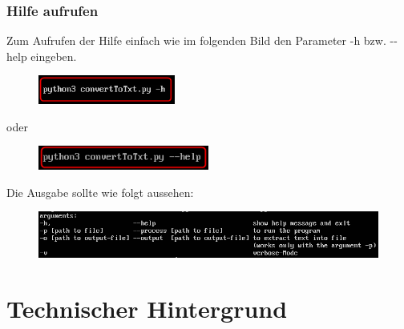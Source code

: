 \documentclass[12pt]{scrartcl}
\begin{document}
\subsubsection{Hilfe aufrufen}
\label{sec:first-steps-help}
Zum Aufrufen der Hilfe einfach wie im folgenden Bild den Parameter -h bzw. -{}-help eingeben.
\newline
\begin{figure}[htbp]
\centering
\includegraphics[width=0.4\textwidth]{ersteSchritteHilfe1}\par\vspace{0.25cm}
\label{fig:ersteSchritteHilfe1}
\end{figure}
\begin{center}
oder
\end{center}
\begin{figure}[htbp]
\centering
\includegraphics[width=0.5\textwidth]{ersteSchritteHilfe2}\par\vspace{0.25cm}
\label{fig:ersteSchritte2}
\end{figure}
Die Ausgabe sollte wie folgt aussehen:
\begin{figure}[htbp]
\centering
\includegraphics[width=1.1\textwidth]{ersteSchritteHilfe3}\par\vspace{0.5cm}
\label{fig:ersteSchritteHilfe3}
\end{figure}
\newpage
\section{Technischer Hintergrund}
\label{sec:technical-background}
\end{document}

